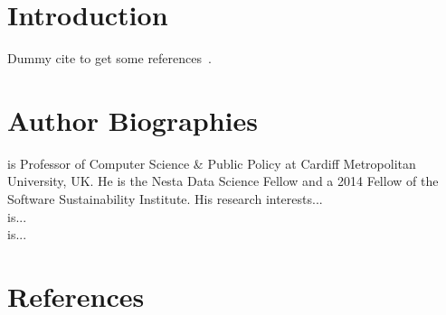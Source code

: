 \documentclass[preprint,12pt,authoryear]{elsarticle}
\begin{document}

\section{Introduction}\label{sec:intro}

Dummy cite to get some
references~\citep{crick-et-al_wssspe2,crick-et-al_recomp2014,venters-et-al_wssspe3}.



\section*{Author Biographies}

 is Professor of Computer Science \& Public Policy
at Cardiff Metropolitan University, UK. He is the Nesta Data Science
Fellow and a 2014 Fellow of the Software Sustainability
Institute. His research interests...\\

 is...\\

 is...

\section*{References}\label{sec:refs}

 






\end{document}
